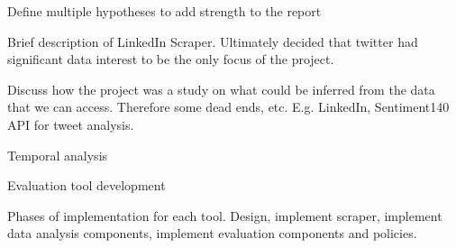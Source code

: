 Define multiple hypotheses to add strength to the report

Brief description of LinkedIn Scraper. Ultimately decided that twitter had significant data interest to be the only focus of the project.

Discuss how the project was a study on what could be inferred from the data that we can access. Therefore some dead ends, etc. E.g. LinkedIn, Sentiment140 API for tweet analysis. 

Temporal analysis

Evaluation tool development

Phases of implementation for each tool. Design, implement scraper, implement data analysis components, implement evaluation components and policies. 